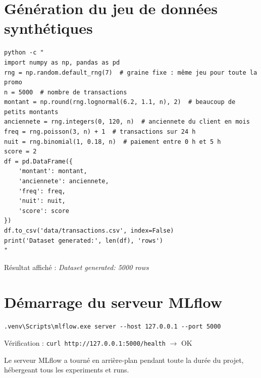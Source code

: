 \documentclass[12pt,a4paper]{report}
\begin{document}
\section{Génération du jeu de données synthétiques}
\begin{verbatim}
python -c "
import numpy as np, pandas as pd
rng = np.random.default_rng(7)  # graine fixe : même jeu pour toute la promo
n = 5000  # nombre de transactions
montant = np.round(rng.lognormal(6.2, 1.1, n), 2)  # beaucoup de petits montants
anciennete = rng.integers(0, 120, n)  # anciennete du client en mois
freq = rng.poisson(3, n) + 1  # transactions sur 24 h
nuit = rng.binomial(1, 0.18, n)  # paiement entre 0 h et 5 h
score = 2
df = pd.DataFrame({
    'montant': montant,
    'anciennete': anciennete,
    'freq': freq,
    'nuit': nuit,
    'score': score
})
df.to_csv('data/transactions.csv', index=False)
print('Dataset generated:', len(df), 'rows')
"
\end{verbatim}
Résultat affiché : \textit{Dataset generated: 5000 rows}

\section{Démarrage du serveur MLflow}
\begin{verbatim}
.venv\Scripts\mlflow.exe server --host 127.0.0.1 --port 5000
\end{verbatim}
Vérification : \texttt{curl http://127.0.0.1:5000/health} $\rightarrow$ OK

Le serveur MLflow a tourné en arrière-plan pendant toute la durée du projet, hébergeant tous les experiments et runs.
\end{document}

